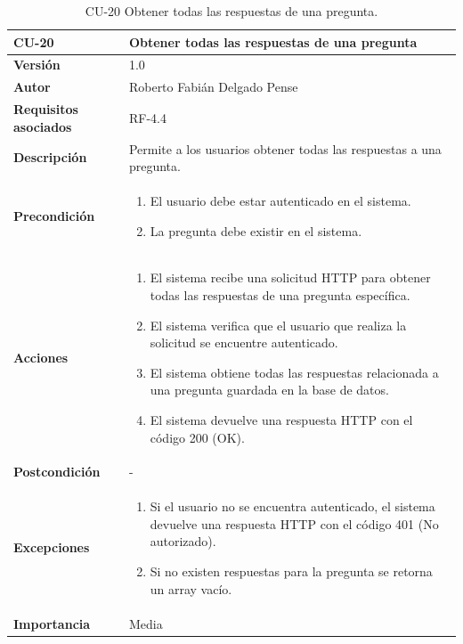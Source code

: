\begin{table}[p]
	\centering
	\begin{tabularx}{\linewidth}{ p{} p{} }
		\toprule
		\textbf{CU-20}    & \textbf{Obtener todas las respuestas de una pregunta}\\
		\toprule
		\textbf{Versión}              & 1.0    \\
		\textbf{Autor}                & Roberto Fabián Delgado Pense \\
		\textbf{Requisitos asociados} & RF-4.4 \\ 
		\textbf{Descripción}          & Permite a los usuarios obtener todas las  respuestas a una pregunta. \\
		\textbf{Precondición}         & 
  		\begin{enumerate}
			\def\labelenumi{\arabic{enumi}.}
			\tightlist
			\item El usuario debe estar autenticado en el sistema.
                \item La pregunta debe existir en el sistema.        
            \end{enumerate}\\
            
		\textbf{Acciones}             &
		\begin{enumerate}
			\def\labelenumi{\arabic{enumi}.}
			\tightlist
			\item El sistema recibe una solicitud HTTP para obtener todas las respuestas de una pregunta         
                        específica.
                \item El sistema verifica que el usuario que realiza la solicitud se encuentre autenticado.
			\item El sistema obtiene todas las respuestas relacionada a una pregunta guardada en la base de datos.
                \item El sistema devuelve una respuesta HTTP con el código 200 (OK).          
            \end{enumerate}\\
		\textbf{Postcondición}        & - \\
		\textbf{Excepciones}          & 
              \begin{enumerate}
			\def\labelenumi{\arabic{enumi}.}
			\tightlist
			\item   Si el usuario no se encuentra autenticado, el sistema devuelve una respuesta HTTP con el código 401 (No autorizado).
			\item Si no existen respuestas para la pregunta se retorna un array vacío.
            \end{enumerate}\\
		\textbf{Importancia}          & Media \\
		\bottomrule
	\end{tabularx}
	\caption{CU-20 Obtener todas las respuestas de una pregunta.}
\end{table}

